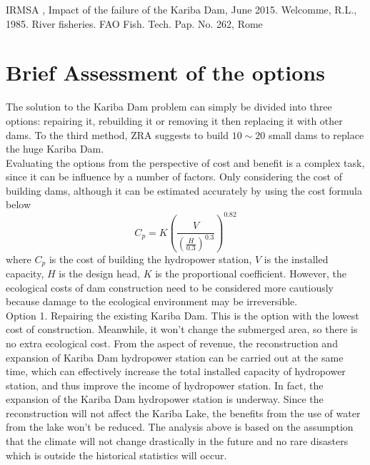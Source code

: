 \documentclass{mcmthesis}
\begin{document}
\begin{thebibliography}{99}
 IRMSA , Impact of the failure of the Kariba Dam, June 2015.
 Welcomme, R.L., 1985. River fisheries. FAO Fish. Tech. Pap. No. 262, Rome

\end{thebibliography}

\clearpage
\section{Brief Assessment of the options}
\indent \indent The solution to the Kariba Dam problem can simply be divided into three options: repairing it, rebuilding it or removing it then replacing it with other dams. To the third method, ZRA suggests to build $10\sim20$ small dams to replace the huge Kariba Dam.\\
\indent Evaluating the options from the perspective of cost and benefit is a complex task, since it can be influence by a number of factors. Only considering the cost of building dams, although it can be estimated accurately by using the cost formula below \\
\[C_{p} = K\left(\frac{V}{\left(\frac{H}{0.3}\right)^{0.3}}\right)^{0.82}\]
where $C_{p}$ is the cost of building the hydropower station, $V$ is the installed capacity, $H$ is the design head, $K$ is the proportional coefficient. However, the ecological costs of dam construction need to be considered more cautiously because damage to the ecological environment may be irreversible.\\
\indent Option 1. Repairing the existing Kariba Dam. This is the option with the lowest cost of construction. Meanwhile, it won't change the submerged area, so there is no extra ecological cost. From the aspect of revenue, the reconstruction and expansion of Kariba Dam hydropower station can be carried out at the same time, which can effectively increase the total installed capacity of hydropower station, and thus improve the income of hydropower station. In fact, the expansion of the Kariba Dam hydropower station is underway. Since the reconstruction will not affect the Kariba Lake, the benefits from the use of water from the lake won't be reduced. The analysis above is based on the assumption that the climate will not change drastically in the future and no rare disasters which is outside the historical statistics will occur.\\
\end{document}
